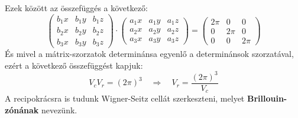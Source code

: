\documentclass[../main.tex]{subfiles}
\begin{document}
Ezek között az összefüggés a következő:
\begin{equation}
    \begin{pmatrix}
        b_1x & b_1y & b_1z \\
        b_2x & b_2y & b_2z \\
        b_3x & b_3y & b_3z
    \end{pmatrix}
    \cdot 
    \begin{pmatrix}
        a_1x & a_1y & a_1z \\
        a_2x & a_2y & a_2z \\
        a_3x & a_3y & a_3z
    \end{pmatrix}
    = \begin{pmatrix}
        2 \pi & 0 & 0 \\
        0 & 2 \pi & 0 \\
        0 & 0 & 2 \pi
    \end{pmatrix}
\end{equation}
És mivel a mátrix-szorzatok determinánsa egyenlő a determinánsok szorzatával, ezért a következő összefüggést kapjuk:
\begin{equation}
    V_c V_r = (2 \pi)^3 \quad \Rightarrow \quad \boxed{V_r = \frac{(2 \pi)^3}{V_c}}
\end{equation}
A recipokrácsra is tudunk Wigner-Seitz cellát szerkeszteni, melyet \textbf{Brillouin-zónának} nevezünk.
\end{document}
